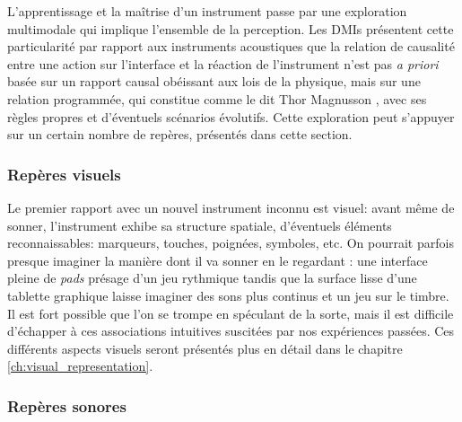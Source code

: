 \noindent L'apprentissage et la maîtrise d'un instrument passe par une exploration multimodale qui implique l'ensemble de la perception. Les \glspl{DMI} présentent cette particularité par rapport aux instruments acoustiques que la relation de causalité entre une action sur l'interface et la réaction de l'instrument n'est pas \textit{a priori} basée sur un rapport causal obéissant aux lois de la physique, mais sur une relation programmée, qui constitue comme le dit Thor Magnusson  \cite{magnusson_sonic_2019}, avec ses règles propres et d'éventuels scénarios évolutifs. Cette exploration peut s'appuyer sur un certain nombre de repères, présentés dans cette section.

\subsubsection{Repères visuels}

\noindent Le premier rapport avec un nouvel instrument inconnu est visuel: avant même de sonner, l'instrument exhibe sa structure spatiale, d'éventuels éléments reconnaissables: marqueurs, touches, poignées, symboles, etc. On pourrait parfois presque imaginer la manière dont il va sonner en le regardant : une interface pleine de \textit{pads} présage d'un jeu rythmique tandis que la surface lisse d'une tablette graphique laisse imaginer des sons plus continus et un jeu sur le timbre. Il est fort possible que l'on se trompe en spéculant de la sorte, mais il est difficile d'échapper à ces associations intuitives suscitées par nos expériences passées. Ces différents aspects visuels seront présentés plus en détail dans le chapitre \ref{ch:visual_representation}.

\subsubsection{Repères sonores}

